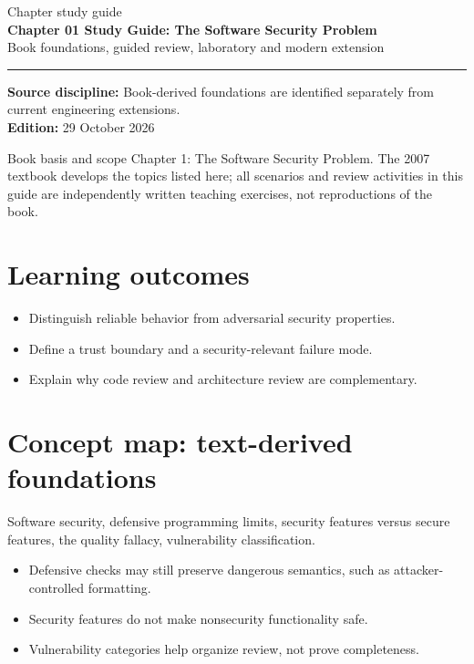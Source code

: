 \documentclass[10pt,letterpaper]{article}
\begin{document}
\hypersetup{pageanchor=false}%
\begin{titlepage}
\vspace*{1.0in}
{\color{bluegray}\Large Chapter study guide}\\[1.0em]
{\color{navy}\Huge\bfseries Chapter 01 Study Guide: The Software Security Problem}\\[0.7em]
{\Large Book foundations, guided review, laboratory and modern extension}\\[2.0em]
\rule{\linewidth}{1.0pt}
\vfill
\textbf{Source discipline:} Book-derived foundations are identified separately from current engineering extensions.\\
\textbf{Edition:} 29 October 2026
\end{titlepage}\hypersetup{pageanchor=true}
\tableofcontents
\clearpage
\begin{focusbox}{Book basis and scope}
Chapter 1: The Software Security Problem. The 2007 textbook develops the topics listed here; all scenarios and review activities in this guide are independently written teaching exercises, not reproductions of the book.\end{focusbox}
\section{Learning outcomes}
\begin{itemize}
\item Distinguish reliable behavior from adversarial security properties.
\item Define a trust boundary and a security-relevant failure mode.
\item Explain why code review and architecture review are complementary.
\end{itemize}

\section{Concept map: text-derived foundations}
Software security, defensive programming limits, security features versus secure features, the quality fallacy, vulnerability classification.
\begin{itemize}
\item Defensive checks may still preserve dangerous semantics, such as attacker-controlled formatting.
\item Security features do not make nonsecurity functionality safe.
\item Vulnerability categories help organize review, not prove completeness.
\end{itemize}
\end{document}
